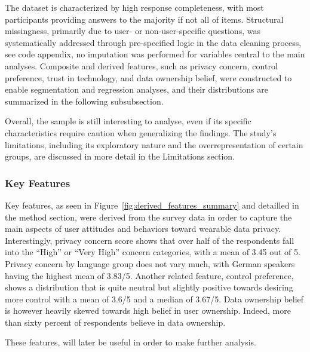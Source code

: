 	The dataset is characterized by high response completeness, with most participants providing answers to the majority if not all of items. Structural missingness, primarily due to user- or non-user-specific questions, was systematically addressed through pre-specified logic in the data cleaning process, see code appendix, no imputation was performed for variables central to the main analyses. Composite and derived features, such as privacy concern, control preference, trust in technology, and data ownership belief, were constructed to enable segmentation and regression analyses, and their distributions are summarized in the following subsubsection.
	
	Overall, the sample is still interesting to analyse, even if its specific characteristics require caution when generalizing the findings. The study's limitations, including its exploratory nature and the overrepresentation of certain groups, are discussed in more detail in the Limitations section.
	\subsubsection{Key Features}
	Key features, as seen in Figure~\ref{fig:derived_features_summary} and detailled in the method section, were derived from the survey data in order to capture the main aspects of user attitudes and behaviors toward wearable data privacy. Interestingly, privacy concern score shows that over half of the respondents fall into the “High” or “Very High” concern categories, with a mean of 3.45 out of 5. Privacy concern by language group does not vary much, with German speakers having the highest mean of 3.83/5.
	Another related feature, control preference, shows a distribution that is quite neutral but slightly positive towards desiring more control with a mean of 3.6/5 and a median of 3.67/5.
	Data ownership belief is however heavily skewed towards high belief in user ownership. Indeed, more than sixty percent of respondents believe in data ownership.     

	These features, will later be useful in order to make further analysis.

